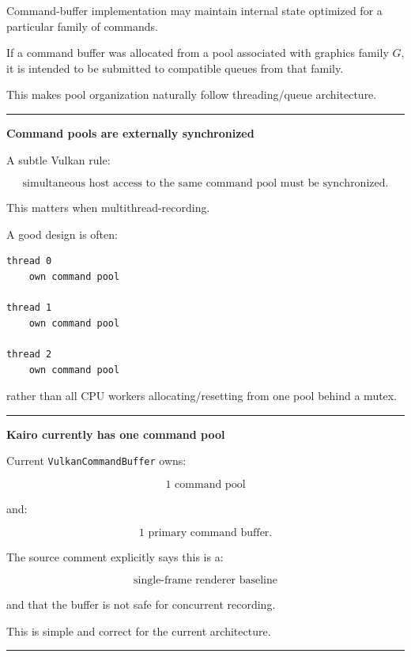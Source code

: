 Command-buffer implementation may maintain internal state optimized for a particular family of commands.

If a command buffer was allocated from a pool associated with graphics family \(G\), it is intended to be submitted to compatible queues from that family.

This makes pool organization naturally follow threading/queue architecture.

\begin{center}\rule{0.5\linewidth}{0.5pt}\end{center}

\textbf{Command pools are externally synchronized}

A subtle Vulkan rule:

\[
\boxed{
\text{simultaneous host access to the same command pool must be synchronized}.
}
\]

This matters when multithread-recording.

A good design is often:

\begin{verbatim}
thread 0
    own command pool

thread 1
    own command pool

thread 2
    own command pool
\end{verbatim}

rather than all CPU workers allocating/resetting from one pool behind a mutex.

\begin{center}\rule{0.5\linewidth}{0.5pt}\end{center}

\textbf{Kairo currently has one command pool}

Current \texttt{VulkanCommandBuffer} owns:

\[
1\text{ command pool}
\]

and:

\[
1\text{ primary command buffer}.
\]

The source comment explicitly says this is a:

\[
\boxed{\text{single-frame renderer baseline}}
\]

and that the buffer is not safe for concurrent recording.

This is simple and correct for the current architecture.

\begin{center}\rule{0.5\linewidth}{0.5pt}\end{center}

